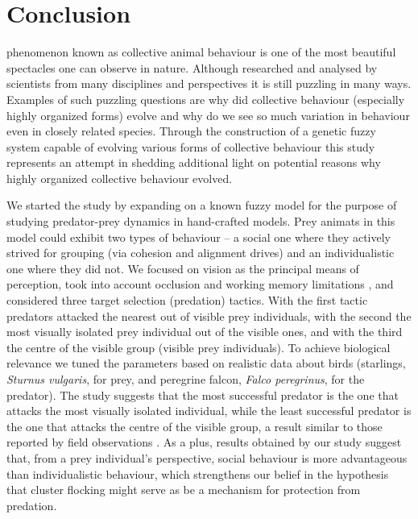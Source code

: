 









\chapter{Conclusion}
\label{chap:conclusion}

 phenomenon known as collective animal behaviour is one of the most beautiful spectacles one can observe in nature. Although researched and analysed by scientists from many disciplines and perspectives it is still puzzling in many ways. Examples of such puzzling questions are why did collective behaviour (especially highly organized forms) evolve and why do we see so much variation in behaviour even in closely related species. Through the construction of a genetic fuzzy system capable of evolving various forms of collective behaviour this study represents an attempt in shedding additional light on potential reasons why highly organized collective behaviour evolved.

We started the study by expanding on a known fuzzy model \cite{lebarbajec2005fuzzy,lebarbajec2005simulating} for the purpose of studying predator-prey dynamics in hand-crafted models. Prey animats in this model \cite{demsar2014simulated} could exhibit two types of behaviour -- a social one where they actively strived for grouping (via cohesion and alignment drives) and an individualistic one where they did not. We focused on vision as the principal means of perception, took into account occlusion \cite{kunz2012simulations} and working memory limitations \cite{ballerini2008interaction,engle1999individual,sherry1989hippocampus}, and considered three target selection (predation) tactics. With the first tactic predators attacked the nearest out of visible prey individuals, with the second the most visually isolated prey individual out of the visible ones, and with the third the centre of the visible group (visible prey individuals). To achieve biological relevance we tuned the parameters based on realistic data about birds (starlings, \emph{Sturnus vulgaris}, for prey, and peregrine falcon, \emph{Falco peregrinus}, for the predator). The study suggests that the most successful predator is the one that attacks the most visually isolated individual, while the least successful predator is the one that attacks the centre of the visible group, a result similar to those reported by field observations \cite{zoratto2010aerial}. As a plus, results obtained by our study suggest that, from a prey individual's perspective, social behaviour is more advantageous than individualistic behaviour, which strengthens our belief in the hypothesis that cluster flocking might serve as be a mechanism for protection from predation.

